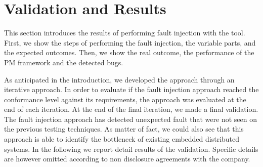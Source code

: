 \section{Validation and Results}\label{sec:results}
This section introduces the results of performing fault injection with the \approach{} %
tool. First, we show the steps of performing the fault injection, the variable parts, and the expected outcomes. Then, we show the real outcome, the performance of the PM framework and the detected bugs.



As anticipated in the introduction, we developed the approach through an iterative approach. In order to evaluate if the fault injection approach reached the conformance level against its requirements, the approach was evaluated at the end of each iteration. 
At the end of the final iteration, we made a final validation. 
The fault injection approach has detected unexpected fault that were not seen on the previous testing techniques. As matter of fact, we could also see that this approach is able to identify the bottleneck of existing embedded distributed systems.  In the following we report detail results of the validation. Specific details are however omitted according to non disclosure agreements with the company.


